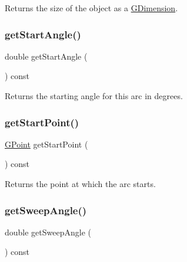Returns the size of the object as a {\ttfamily \mbox{\hyperlink{structsgl_1_1GDimension}{G\+Dimension}}}. 

\mbox{\label{classsgl_1_1GArc_ad52005815f95967f10ea54d290fa61ad}} 
\subsubsection{\texorpdfstring{get\+Start\+Angle()}{getStartAngle()}}
{\footnotesize\ttfamily double get\+Start\+Angle (\begin{DoxyParamCaption}{ }\end{DoxyParamCaption}) const\hspace{0.3cm}{\ttfamily [virtual]}}



Returns the starting angle for this arc in degrees. 

\mbox{\label{classsgl_1_1GArc_ad12beaa70993d9b409bfa8fd86c83957}} 
\subsubsection{\texorpdfstring{get\+Start\+Point()}{getStartPoint()}}
{\footnotesize\ttfamily \mbox{\hyperlink{structsgl_1_1GPoint}{G\+Point}} get\+Start\+Point (\begin{DoxyParamCaption}{ }\end{DoxyParamCaption}) const\hspace{0.3cm}{\ttfamily [virtual]}}



Returns the point at which the arc starts. 

\mbox{\label{classsgl_1_1GArc_ae842751a5db1493113ff347e564efae1}} 
\subsubsection{\texorpdfstring{get\+Sweep\+Angle()}{getSweepAngle()}}
{\footnotesize\ttfamily double get\+Sweep\+Angle (\begin{DoxyParamCaption}{ }\end{DoxyParamCaption}) const\hspace{0.3cm}{\ttfamily [virtual]}}



